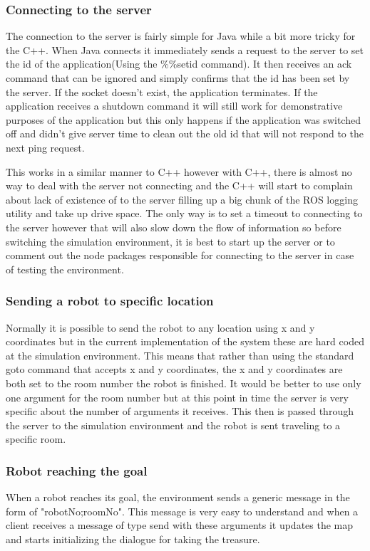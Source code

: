 \documentclass{report}
\begin{document}
        \subsubsection{Connecting to the server}
          The connection to the server is fairly simple for Java while a bit more tricky for the C++. When Java connects it immediately sends a request to the server to set the id of the application(Using the \%\%setid command). It then receives an ack command that can be ignored and simply confirms that the id has been set by the server. If the socket doesn't exist, the application terminates. If the application receives a shutdown command it will still work for demonstrative purposes of the application but this only happens if the application was switched off and didn't give server time to clean out the old id that will not respond to the next ping request.

          This works in a similar manner to C++ however with C++, there is almost no way to deal with the server not connecting and the C++ will start to complain about lack of existence of to the server filling up a big chunk of the ROS logging utility and take up drive space. The only way is to set a timeout to connecting to the server however that will also slow down the flow of information so before switching the simulation environment, it is best to start up the server or to comment out the node packages responsible for connecting to the server in case of testing the environment.

        \subsubsection{Sending a robot to specific location}
          Normally it is possible to send the robot to any location using x and y coordinates but in the current implementation of the system these are hard coded at the simulation environment. This means that rather than using the standard goto command that accepts x and y coordinates, the x and y coordinates are both set to the room number the robot is finished. It would be better to use only one argument for the room number but at this point in time the server is very specific about the number of arguments it receives. This then is passed through the server to the simulation environment and the robot is sent traveling to a specific room.

        \subsubsection{Robot reaching the goal}
          When a robot reaches its goal, the environment sends a generic message in the form of "robotNo;roomNo". This message is very easy to understand and when a client receives a message of type send with these arguments it updates the map and starts initializing the dialogue for taking the treasure.
\end{document}
